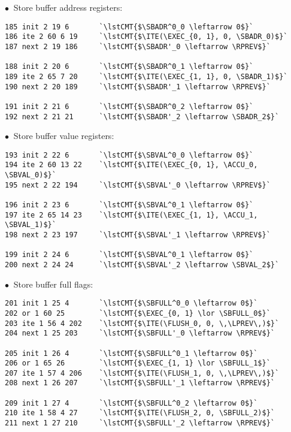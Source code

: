 \noindent
$\bullet\ $ Store buffer address registers:
\begin{lstlisting}[style=btor2]
185 init 2 19 6       `\lstCMT{$\SBADR^0_0 \leftarrow 0$}`
186 ite 2 60 6 19     `\lstCMT{$\ITE(\EXEC_{0, 1}, 0, \SBADR_0)$}`
187 next 2 19 186     `\lstCMT{$\SBADR'_0 \leftarrow \RPREV$}`

188 init 2 20 6       `\lstCMT{$\SBADR^0_1 \leftarrow 0$}`
189 ite 2 65 7 20     `\lstCMT{$\ITE(\EXEC_{1, 1}, 0, \SBADR_1)$}`
190 next 2 20 189     `\lstCMT{$\SBADR'_1 \leftarrow \RPREV$}`

191 init 2 21 6       `\lstCMT{$\SBADR^0_2 \leftarrow 0$}`
192 next 2 21 21      `\lstCMT{$\SBADR'_2 \leftarrow \SBADR_2$}`
\end{lstlisting}

\noindent
$\bullet\ $ Store buffer value registers:
\begin{lstlisting}[style=btor2]
193 init 2 22 6       `\lstCMT{$\SBVAL^0_0 \leftarrow 0$}`
194 ite 2 60 13 22    `\lstCMT{$\ITE(\EXEC_{0, 1}, \ACCU_0, \SBVAL_0)$}`
195 next 2 22 194     `\lstCMT{$\SBVAL'_0 \leftarrow \RPREV$}`

196 init 2 23 6       `\lstCMT{$\SBVAL^0_1 \leftarrow 0$}`
197 ite 2 65 14 23    `\lstCMT{$\ITE(\EXEC_{1, 1}, \ACCU_1, \SBVAL_1)$}`
198 next 2 23 197     `\lstCMT{$\SBVAL'_1 \leftarrow \RPREV$}`

199 init 2 24 6       `\lstCMT{$\SBVAL^0_1 \leftarrow 0$}`
200 next 2 24 24      `\lstCMT{$\SBVAL'_2 \leftarrow \SBVAL_2$}`
\end{lstlisting}

\noindent
$\bullet\ $ Store buffer full flags:
\begin{lstlisting}[style=btor2]
201 init 1 25 4       `\lstCMT{$\SBFULL^0_0 \leftarrow 0$}`
202 or 1 60 25        `\lstCMT{$\EXEC_{0, 1} \lor \SBFULL_0$}`
203 ite 1 56 4 202    `\lstCMT{$\ITE(\FLUSH_0, 0, \,\LPREV\,)$}`
204 next 1 25 203     `\lstCMT{$\SBFULL'_0 \leftarrow \RPREV$}`

205 init 1 26 4       `\lstCMT{$\SBFULL^0_1 \leftarrow 0$}`
206 or 1 65 26        `\lstCMT{$\EXEC_{1, 1} \lor \SBFULL_1$}`
207 ite 1 57 4 206    `\lstCMT{$\ITE(\FLUSH_1, 0, \,\LPREV\,)$}`
208 next 1 26 207     `\lstCMT{$\SBFULL'_1 \leftarrow \RPREV$}`

209 init 1 27 4       `\lstCMT{$\SBFULL^0_2 \leftarrow 0$}`
210 ite 1 58 4 27     `\lstCMT{$\ITE(\FLUSH_2, 0, \SBFULL_2)$}`
211 next 1 27 210     `\lstCMT{$\SBFULL'_2 \leftarrow \RPREV$}`
\end{lstlisting}

